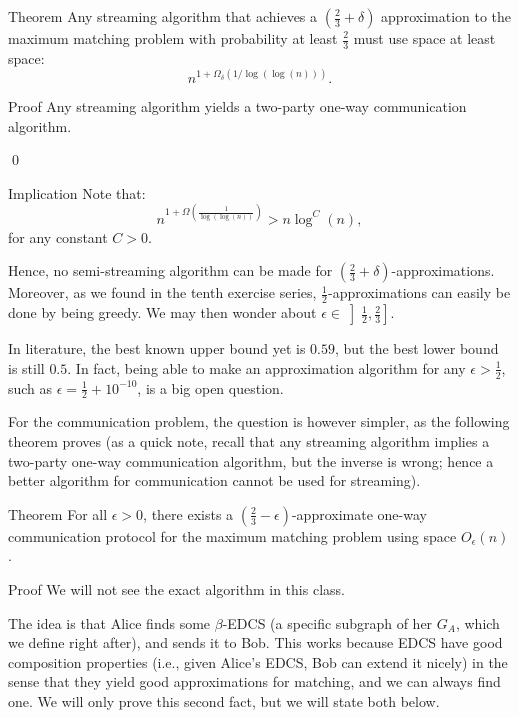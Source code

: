 \documentclass[a4paper]{article}
\begin{document}
\begin{parag}{Theorem}
    Any streaming algorithm that achieves a $\left(\frac{2}{3} + \delta\right)$ approximation to the maximum matching problem with probability at least $\frac{2}{3}$ must use space at least space:
    \[n^{1 + \Omega_{\delta}\left(1/\log\left(\log\left(n\right)\right)\right)}.\]

    \begin{subparag}{Proof}
        Any streaming algorithm yields a two-party one-way communication algorithm.

        \qed
    \end{subparag}

    \begin{subparag}{Implication}
        Note that: 
        \[n^{1 + \Omega\left(\frac{1}{\log\left(\log\left(n\right)\right)}\right)} > n\log^C\left(n\right),\]
        for any constant $C > 0$.

        Hence, no semi-streaming algorithm can be made for $\left(\frac{2}{3} + \delta\right)$-approximations. Moreover, as we found in the tenth exercise series, $\frac{1}{2}$-approximations can easily be done by being greedy. We may then wonder about $\epsilon \in \left]\frac{1}{2}, \frac{2}{3}\right].$ 

        In literature, the best known upper bound yet is $0.59$, but the best lower bound is still $0.5$. In fact, being able to make an approximation algorithm for any $\epsilon > \frac{1}{2}$, such as $\epsilon = \frac{1}{2} + 10^{-10}$, is a big open question. 

        For the communication problem, the question is however simpler, as the following theorem proves (as a quick note, recall that any streaming algorithm implies a two-party one-way communication algorithm, but the inverse is wrong; hence a better algorithm for communication cannot be used for streaming).
    \end{subparag}
\end{parag}

\begin{parag}{Theorem}
    For all $\epsilon > 0$, there exists a $\left(\frac{2}{3} - \epsilon\right)$-approximate one-way communication protocol for the maximum matching problem using space $O_{\epsilon}\left(n\right)$.

    \begin{subparag}{Proof}
        We will not see the exact algorithm in this class. 

        The idea is that Alice finds some $\beta$-EDCS (a specific subgraph of her $G_A$, which we define right after), and sends it to Bob. This works because EDCS have good composition properties (i.e., given Alice's EDCS, Bob can extend it nicely) in the sense that they yield good approximations for matching, and we can always find one. We will only prove this second fact, but we will state both below.
    \end{subparag}
\end{parag}
\end{document}
